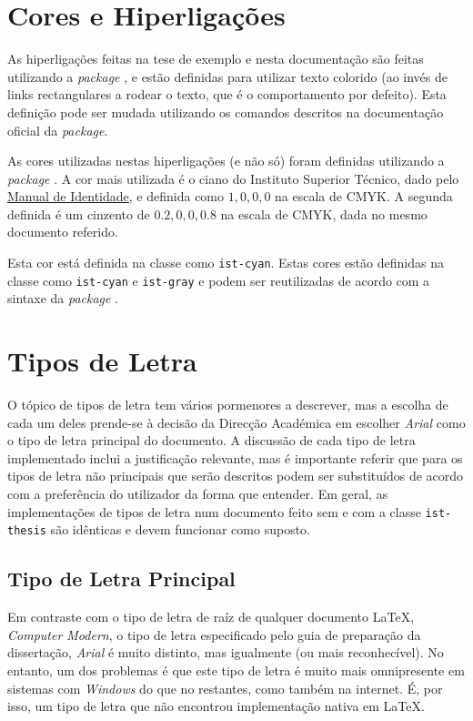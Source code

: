 \documentclass{../ist-thesis}
\begin{document}
\section{Cores e Hiperligações}

As hiperligações feitas na tese de exemplo e nesta documentação são feitas utilizando a \textit{package} , e estão definidas para utilizar texto colorido (ao invés de links rectangulares a rodear o texto, que é o comportamento por defeito). Esta definição pode ser mudada utilizando os comandos descritos na documentação oficial da \textit{package}.

As cores utilizadas nestas hiperligações (e não só) foram definidas utilizando a \textit{package} . A cor mais utilizada é o ciano do Instituto Superior Técnico, dado pelo \href{https://tecnico.ulisboa.pt/pt/sobre-o-tecnico/institucional/logo-e-manual-de-identidade/}{Manual de Identidade}, e definida como $1,0,0,0$ na escala de CMYK. A segunda definida é um cinzento de $0.2,0,0,0.8$ na escala de CMYK, dada no mesmo documento referido.

Esta cor está definida na classe como \texttt{ist-cyan}.
Estas cores estão definidas na classe como \texttt{ist-cyan} e \texttt{ist-gray} e podem ser reutilizadas de acordo com a sintaxe da \textit{package} .

\section{Tipos de Letra}

O tópico de tipos de letra tem vários pormenores a descrever, mas a escolha de cada um deles prende-se à decisão da Direcção Académica em escolher \textit{Arial} como o tipo de letra principal do documento. A discussão de cada tipo de letra implementado inclui a justificação relevante, mas é importante referir que para os tipos de letra não principais que serão descritos podem ser substituídos de acordo com a preferência do utilizador da forma que entender. Em geral, as implementações de tipos de letra num documento feito sem e com a classe \texttt{ist-thesis} são idênticas e devem funcionar como suposto.

\subsection{Tipo de Letra Principal}
\label{sec:mainfont}

Em contraste com o tipo de letra de raíz de qualquer documento \LaTeX{}\footnotemark{}, \textit{Computer Modern}, o tipo de letra especificado pelo guia de preparação da dissertação, \textit{Arial} é muito distinto, mas igualmente (ou mais reconhecível). No entanto, um dos problemas é que este tipo de letra é muito mais omnipresente em sistemas com \textit{Windows} do que no restantes, como também na internet. É, por isso, um tipo de letra que não encontrou implementação nativa em \LaTeX{}.
\end{document}
